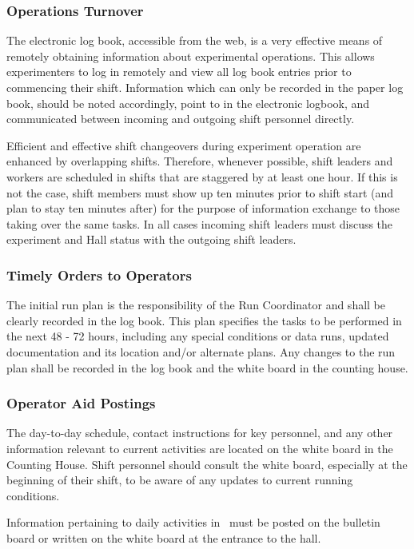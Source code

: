\documentclass[11pt]{article}
\begin{document}
\subsubsection{Operations Turnover}
The electronic log book, accessible from the web, is a very effective means 
of remotely obtaining information about experimental operations. This allows 
experimenters to log in remotely and view all log book 
entries prior to commencing their shift.
Information which can only be recorded in the paper log book, should be
noted accordingly, point to in the electronic logbook, and communicated between incoming and outgoing shift 
personnel directly.

Efficient and effective shift changeovers during experiment operation 
are enhanced by overlapping shifts. Therefore, whenever possible, shift leaders 
and workers are scheduled in shifts that are staggered by at least one hour.  If this is not the case, shift members must show
up ten minutes prior to shift start (and plan to stay ten minutes after) for the
purpose of information exchange to those taking over the same tasks.
In all cases incoming shift leaders must discuss the experiment and Hall status with the
outgoing shift leaders.

\subsubsection{Timely Orders to Operators}
The initial run plan is the responsibility of the Run Coordinator and
shall be clearly recorded in the log book. This plan specifies
the tasks to be performed in the next 48 - 72 hours, including
any special conditions or data runs, updated documentation and its
location and/or alternate plans. Any changes to the run plan shall
be recorded in the log book and the white board in the counting house.

\subsubsection{Operator Aid Postings}
The day-to-day schedule, contact instructions for key personnel, and 
any other information relevant to current activities are located
on the white board in the Counting House. Shift personnel should
consult the white board, especially at the beginning
of their shift, to be aware of any updates to current running conditions.

Information pertaining to daily activities in \HALL\ must be posted on the 
bulletin board or written on the white board at the entrance to the hall.
\end{document}
